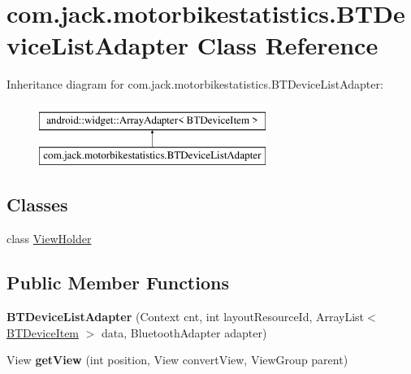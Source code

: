 \hypertarget{classcom_1_1jack_1_1motorbikestatistics_1_1_b_t_device_list_adapter}{}\section{com.\+jack.\+motorbikestatistics.\+B\+T\+Device\+List\+Adapter Class Reference}
\label{classcom_1_1jack_1_1motorbikestatistics_1_1_b_t_device_list_adapter}
Inheritance diagram for com.\+jack.\+motorbikestatistics.\+B\+T\+Device\+List\+Adapter\+:\begin{figure}[H]
\begin{center}
\leavevmode
\includegraphics[height=2.000000cm]{classcom_1_1jack_1_1motorbikestatistics_1_1_b_t_device_list_adapter}
\end{center}
\end{figure}
\subsection*{Classes}
\begin{DoxyCompactItemize}
\item 
class \hyperlink{classcom_1_1jack_1_1motorbikestatistics_1_1_b_t_device_list_adapter_1_1_view_holder}{View\+Holder}
\end{DoxyCompactItemize}
\subsection*{Public Member Functions}
\begin{DoxyCompactItemize}
\item 
\mbox{\label{classcom_1_1jack_1_1motorbikestatistics_1_1_b_t_device_list_adapter_a103bf9deb20f6a547537da994f66b92f}} 
{\bfseries B\+T\+Device\+List\+Adapter} (Context cnt, int layout\+Resource\+Id, Array\+List$<$ \hyperlink{classcom_1_1jack_1_1motorbikestatistics_1_1_b_t_device_item}{B\+T\+Device\+Item} $>$ data, Bluetooth\+Adapter adapter)
\item 
\mbox{\label{classcom_1_1jack_1_1motorbikestatistics_1_1_b_t_device_list_adapter_ab9e3230f609c8a8195c3e4e9c2b26b2e}} 
View {\bfseries get\+View} (int position, View convert\+View, View\+Group parent)
\end{DoxyCompactItemize}
